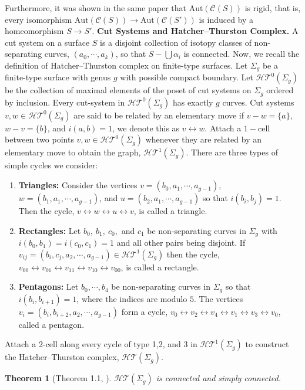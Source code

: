 \documentclass[11pt]{article}
\def\lr{\leftrightarrow}
\def\a{\alpha}
\def\Aut{\text{Aut}}
\newtheorem{theorem}{Theorem}[section]
\begin{document}
Furthermore, it was shown in the same paper that $\Aut( \mathcal{C}(S))$ is rigid, that is, every isomorphism $\Aut( \mathcal{C}(S)) \to \Aut( \mathcal{C}(S'))$ is induced by a homeomorphism $S\to S'$.
\vspace{1em}
\newline
\textbf{Cut Systems and Hatcher--Thurston Complex.} A cut system on a surface $S$ is a disjoint collection of isotopy classes of non-separating curves, $(a_0,\cdots, a_k)$, so that $S-\bigcup \a_i$ is connected. Now, we recall the definition of Hatcher--Thurston complex on finite-type surfaces. Let $\Sigma_g$ be a finite-type surface with genus $g$ with possible compact boundary. Let $ \mathcal{HT}^0(\Sigma_g)$ be the collection of maximal elements of the poset of cut systems on $\Sigma_g$ ordered by inclusion. Every cut-system in $ \mathcal{HT}^0(\Sigma_g)$ has exactly $g$ curves. Cut systems $v,w\in \mathcal{HT}^0(\Sigma_g)$ are said to be related by an elementary move if $v-w = \{a\}$, $w-v = \{b\}$, and $i(a,b) = 1$, we denote this as $v \leftrightarrow w$. Attach a $1-$cell between two points $ v,w\in \mathcal{HT}^0(\Sigma_g)$ whenever they are related by an elementary move to obtain the graph, $ \mathcal{HT}^1(\Sigma_g)$. There are three types of simple cycles we consider:
\begin{enumerate}
  \item \textbf{Triangles:} Consider the vertices $v = (b_0, a_1, \cdots, a_{g-1})$, $w=(b_1, a_1,\cdots, a_{g-1})$, and $u=(b_2, a_1,\cdots, a_{g-1})$ so that  $i(b_i,b_j) = 1$. Then the cycle, $v \lr w \lr u \lr v$, is called a triangle. 
  \item \textbf{Rectangles:} Let $b_0,\ b_1,\ c_0,$ and $c_1$ be non-separating curves in $\Sigma_g$ with $i(b_0,b_1) = i(c_0,c_1) = 1$ and all other pairs being disjoint. If $v_{ij} = (b_i, c_j, a_2,\cdots, a_{g-1})\in \mathcal{HT}^1(\Sigma_g)$ then the cycle, $v_{00}\lr v_{01}\lr v_{11} \lr v_{10} \lr v_{00}$, is called a rectangle.
  \item \textbf{Pentagons:} Let $b_0,\cdots, b_4$ be non-separating curves in $\Sigma_g$ so that $i(b_i,b_{i+1}) = 1$, where the indices are modulo $5$. The vertices $v_i = (b_i, b_{i+2}, a_2,\cdots, a_{g-1})$ form a cycle, $v_0\lr v_2\lr v_4\lr v_1 \lr v_3\lr v_0$, called a pentagon.
\end{enumerate}
Attach a 2-cell along every cycle of type 1,2, and 3 in $ \mathcal{HT}^1(\Sigma_g)$ to construct the Hatcher--Thurston complex, $ \mathcal{HT}(\Sigma_g)$.
\begin{theorem}[Theorem 1.1, \cite{hatcher}]
  $ \mathcal{HT}(\Sigma_g)$ is connected and simply connected.
\end{theorem}
\end{document}
